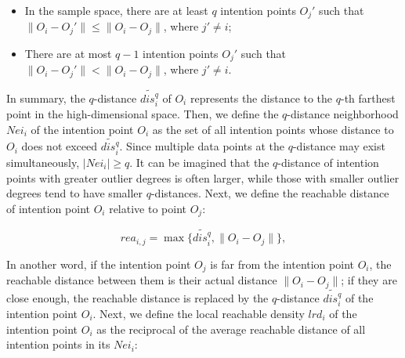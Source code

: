 \documentclass[lettersize,journal]{IEEEtran}
\begin{document}

\begin{itemize}
    \item In the sample space, there are at least $q$ intention points $O_j'$ such that $\|O_i-O_j'\| \leq \|O_i-O_j\|$, where $j' \neq i$;
    \item There are at most $q-1$ intention points $O_j'$ such that $\|O_i-O_j'\| < \|O_i-O_j\|$, where $j' \neq i$.
\end{itemize}

In summary, the $q$-distance $\widetilde{dis_i^q}$ of $O_i$ represents the distance to the $q$-th farthest point in the high-dimensional space. Then, we define the $q$-distance neighborhood $Nei_i$ of the intention point $O_i$ as the set of all intention points whose distance to $O_i$ does not exceed $\widetilde{dis_i^q}$. Since multiple data points at the $q$-distance may exist simultaneously, $|Nei_i| \geq q$. It can be imagined that the $q$-distance of intention points with greater outlier degrees is often larger, while those with smaller outlier degrees tend to have smaller $q$-distances. Next, we define the reachable distance of intention point $O_i$ relative to point $O_j$:

\begin{equation}
rea_{i,j}=\max\{\widetilde{dis_i^q}, \|O_i-O_j\|\},
\end{equation}

In another word, if the intention point $O_j$ is far from the intention point $O_i$, the reachable distance between them is their actual distance $\|O_i-O_j\|$; if they are close enough, the reachable distance is replaced by the $q$-distance $\widetilde{dis_i^q}$ of the intention point $O_i$. Next, we define the local reachable density $lrd_i$ of the intention point $O_i$ as the reciprocal of the average reachable distance of all intention points in its $Nei_i$:
\end{document}
